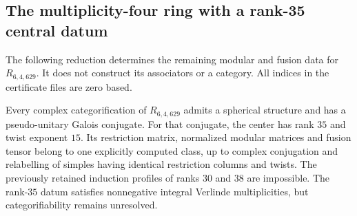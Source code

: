 \subsection{The multiplicity-four ring with a rank-35 central datum}
\label{subsec:frontier-629}

The following reduction determines the remaining modular and fusion data
for $R_{6,4,629}$. It does not construct its associators or a category.
All indices in the certificate files are zero based.

\begin{theorem}
\label{thm:629-modular-reduction}
Every complex categorification of $R_{6,4,629}$ admits a spherical
structure and has a pseudo-unitary Galois conjugate. For that conjugate,
the center has rank $35$ and twist exponent $15$. Its restriction matrix,
normalized modular matrices and fusion tensor belong to one explicitly
computed class, up to complex conjugation and relabelling of simples
having identical restriction columns and twists.
The previously retained induction profiles of ranks $30$ and $38$ are
impossible. The rank-$35$ datum satisfies nonnegative integral Verlinde
multiplicities, but categorifiability remains unresolved.
\end{theorem}

